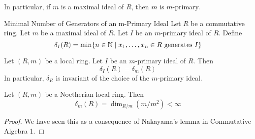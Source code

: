 \documentclass[a4paper]{article}
\begin{document}
In particular, if $m$ is a maximal ideal of $R$, then $m$ is $m$-primary. 

\begin{defn}{Minimal Number of Generators of an m-Primary Ideal}{} Let $R$ be a commutative ring. Let $m$ be a maximal ideal of $R$. Let $I$ be an $m$-primary ideal of $R$. Define $$\delta_I(R)=\min\{n\in\mathbb{N}\;|\;x_1,\dots,x_n\in R\text{ generates }I\}$$
\end{defn}

\begin{prp}{}{} Let $(R,m)$ be a local ring. Let $I$ be an $m$-primary ideal of $R$. Then $$\delta_I(R)=\delta_m(R)$$ In particular, $\delta_R$ is invariant of the choice of the $m$-primary ideal. 
\end{prp}

\begin{prp}{}{} Let $(R,m)$ be a Noetherian local ring. Then $$\delta_m(R)=\dim_{R/m}(m/m^2)<\infty$$ \tcbline
\begin{proof}
We have seen this as a consequence of Nakayama's lemma in Commutative Algebra 1. 
\end{proof}
\end{prp}
\end{document}
